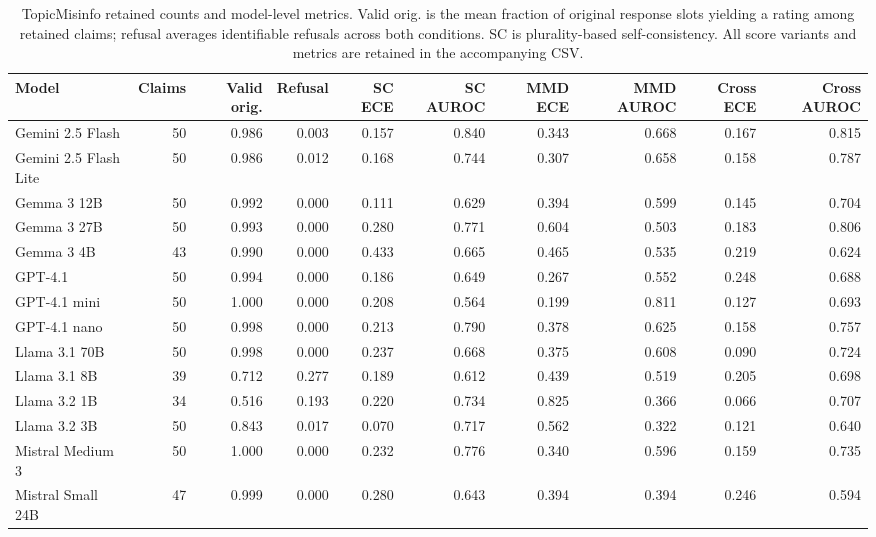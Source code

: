 \begin{table}[t]
\centering\scriptsize\revisioncolor
\setlength{\tabcolsep}{3pt}
\begin{tabular}{lrrrrrrrrr}
\toprule
Model & Claims & Valid orig. & Refusal & SC ECE & SC AUROC & MMD ECE & MMD AUROC & Cross ECE & Cross AUROC \\
\midrule
Gemini 2.5 Flash & 50 & 0.986 & 0.003 & 0.157 & 0.840 & 0.343 & 0.668 & 0.167 & 0.815 \\
Gemini 2.5 Flash Lite & 50 & 0.986 & 0.012 & 0.168 & 0.744 & 0.307 & 0.658 & 0.158 & 0.787 \\
Gemma 3 12B & 50 & 0.992 & 0.000 & 0.111 & 0.629 & 0.394 & 0.599 & 0.145 & 0.704 \\
Gemma 3 27B & 50 & 0.993 & 0.000 & 0.280 & 0.771 & 0.604 & 0.503 & 0.183 & 0.806 \\
Gemma 3 4B & 43 & 0.990 & 0.000 & 0.433 & 0.665 & 0.465 & 0.535 & 0.219 & 0.624 \\
GPT-4.1 & 50 & 0.994 & 0.000 & 0.186 & 0.649 & 0.267 & 0.552 & 0.248 & 0.688 \\
GPT-4.1 mini & 50 & 1.000 & 0.000 & 0.208 & 0.564 & 0.199 & 0.811 & 0.127 & 0.693 \\
GPT-4.1 nano & 50 & 0.998 & 0.000 & 0.213 & 0.790 & 0.378 & 0.625 & 0.158 & 0.757 \\
Llama 3.1 70B & 50 & 0.998 & 0.000 & 0.237 & 0.668 & 0.375 & 0.608 & 0.090 & 0.724 \\
Llama 3.1 8B & 39 & 0.712 & 0.277 & 0.189 & 0.612 & 0.439 & 0.519 & 0.205 & 0.698 \\
Llama 3.2 1B & 34 & 0.516 & 0.193 & 0.220 & 0.734 & 0.825 & 0.366 & 0.066 & 0.707 \\
Llama 3.2 3B & 50 & 0.843 & 0.017 & 0.070 & 0.717 & 0.562 & 0.322 & 0.121 & 0.640 \\
Mistral Medium 3 & 50 & 1.000 & 0.000 & 0.232 & 0.776 & 0.340 & 0.596 & 0.159 & 0.735 \\
Mistral Small 24B & 47 & 0.999 & 0.000 & 0.280 & 0.643 & 0.394 & 0.394 & 0.246 & 0.594 \\
\bottomrule
\end{tabular}
\caption{TopicMisinfo retained counts and model-level metrics. Valid orig. is the mean fraction of original response slots yielding a rating among retained claims; refusal averages identifiable refusals across both conditions. SC is plurality-based self-consistency. All score variants and metrics are retained in the accompanying CSV.}
\label{tab:topic_models}
\end{table}
